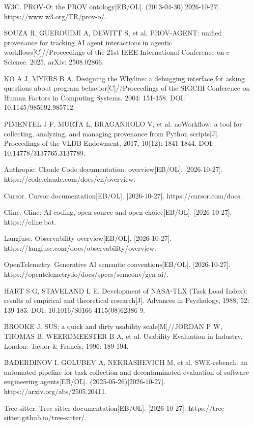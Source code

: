 {\begin{tjreflist}
\item W3C. PROV-O: the PROV ontology[EB/OL]. (2013-04-30)[2026-10-27]. https://www.w3.org/TR/prov-o/.
\item SOUZA R, GUEROUDJI A, DEWITT S, et al. PROV-AGENT: unified provenance for tracking AI agent interactions in agentic workflows[C]//Proceedings of the 21st IEEE International Conference on e-Science. 2025. arXiv: 2508.02866.
\item KO A J, MYERS B A. Designing the Whyline: a debugging interface for asking questions about program behavior[C]//Proceedings of the SIGCHI Conference on Human Factors in Computing Systems. 2004: 151-158. DOI: 10.1145/985692.985712.
\item PIMENTEL J F, MURTA L, BRAGANHOLO V, et al. noWorkflow: a tool for collecting, analyzing, and managing provenance from Python scripts[J]. Proceedings of the VLDB Endowment, 2017, 10(12): 1841-1844. DOI: 10.14778/3137765.3137789.
\item Anthropic. Claude Code documentation: overview[EB/OL]. [2026-10-27]. https://code.claude.com/docs/en/overview.
\item Cursor. Cursor documentation[EB/OL]. [2026-10-27]. https://cursor.com/docs.
\item Cline. Cline: AI coding, open source and open choice[EB/OL]. [2026-10-27]. https://cline.bot.
\item Langfuse. Observability overview[EB/OL]. [2026-10-27]. https://langfuse.com/docs/observability/overview.
\item OpenTelemetry. Generative AI semantic conventions[EB/OL]. [2026-10-27]. https://opentelemetry.io/docs/specs/semconv/gen-ai/.
\item HART S G, STAVELAND L E. Development of NASA-TLX (Task Load Index): results of empirical and theoretical research[J]. Advances in Psychology, 1988, 52: 139-183. DOI: 10.1016/S0166-4115(08)62386-9.
\item BROOKE J. SUS: a quick and dirty usability scale[M]//JORDAN P W, THOMAS B, WEERDMEESTER B A, et al. Usability Evaluation in Industry. London: Taylor \& Francis, 1996: 189-194.
\item BADERDINOV I, GOLUBEV A, NEKRASHEVICH M, et al. SWE-rebench: an automated pipeline for task collection and decontaminated evaluation of software engineering agents[EB/OL]. (2025-05-26)[2026-10-27]. https://arxiv.org/abs/2505.20411.
\item Tree-sitter. Tree-sitter documentation[EB/OL]. [2026-10-27]. https://tree-sitter.github.io/tree-sitter/.
\end{tjreflist}
}

